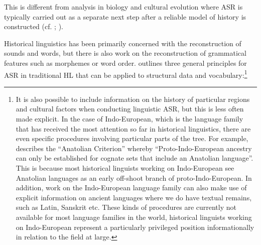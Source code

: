 \documentclass[12pt,letterpaper]{article}
\begin{document}
This is different from analysis in biology and cultural evolution where ASR is typically carried out as a separate next step after a reliable model of history is constructed (cf. \citealt{holland2020accuracy}; \citealt{evans2021uses}). 






Historical linguistics has been primarily concerned with the reconstruction of sounds and words, but there is also work on the reconstruction of grammatical features such as morphemes or word order. \citet[17--22]{clark1973aspects} outlines three general principles for ASR in traditional HL that can be applied to structural data and vocabulary:\footnote{It is also possible to include information on the history of particular regions and cultural factors when conducting linguistic ASR, but this is less often made explicit. In the case of Indo-European, which is the language family that has received the most attention so far in historical linguistics, there are even specific procedures involving particular parts of the tree. For example, \citet[6]{goldstein_2022} describes the ``Anatolian Criterion'' whereby ``Proto-Indo-European ancestry can only be established for cognate sets that include an Anatolian language''. This is because most historical linguists working on Indo-European see Anatolian languages as an early off-shoot branch of proto-Indo-European. In addition, work on the Indo-European language family can also make use of explicit information on ancient languages where we do have textual remains, such as Latin, Sanskrit etc. These kinds of procedures are currently not available for most language families in the world, historical linguists working on Indo-European represent a particularly privileged position informationally in relation to the field at large.}
\end{document}
